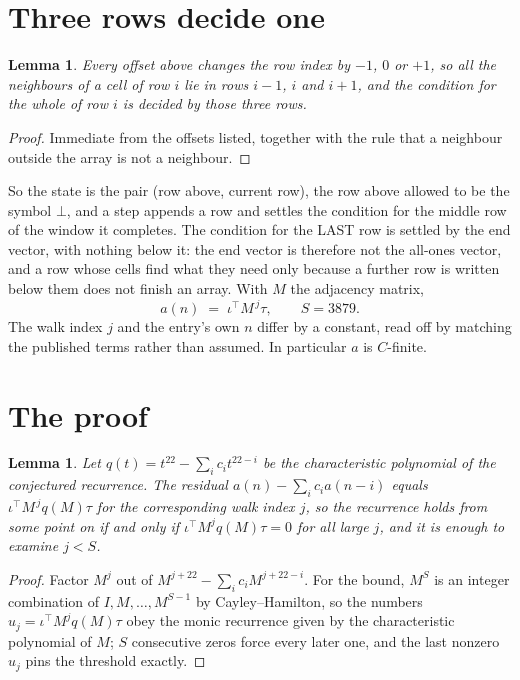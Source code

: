 \documentclass[11pt,a4paper]{article}
\theoremstyle{plain}
\newtheorem{lemma}[theorem]{Lemma}
\theoremstyle{definition}
\begin{document}
\section{Three rows decide one}

\begin{lemma}\label{lem:win}
Every offset above changes the row index by $-1$, $0$ or $+1$, so all the neighbours of a cell
of row $i$ lie in rows $i-1$, $i$ and $i+1$, and the condition for the whole of row $i$ is
decided by those three rows.
\end{lemma}

\begin{proof}
Immediate from the offsets listed, together with the rule that a neighbour outside the array is
not a neighbour.
\end{proof}

So the state is the pair (row above, current row), the row above allowed to be the symbol
$\bot$, and a step appends a row and settles the condition for the middle row of the window it
completes. The condition for the LAST row is settled by the end vector, with nothing below it:
the end vector is therefore not the all-ones vector, and a row whose cells find what they need
only because a further row is written below them does not finish an array. With $M$ the
adjacency matrix,
\[
a(n)\;=\;\iota^{\!\top}M^{\,j}\tau ,\qquad S=3879.
\]
The walk index $j$ and the entry's own $n$ differ by a constant, read off by matching the
published terms rather than assumed. In particular $a$ is $C$-finite.

\section{The proof}

\begin{lemma}\label{lem:crit}
Let $q(t)=t^{22}-\sum_i c_it^{22-i}$ be the characteristic polynomial of the
conjectured recurrence. The residual $a(n)-\sum_ic_ia(n-i)$ equals
$\iota^{\!\top}M^{\,j}q(M)\tau$ for the corresponding walk index $j$, so the recurrence
holds from some point on if and only if $\iota^{\!\top}M^{j}q(M)\tau=0$ for all large $j$,
and it is enough to examine $j<S$.
\end{lemma}

\begin{proof}
Factor $M^{j}$ out of $M^{j+22}-\sum_ic_iM^{j+22-i}$. For the bound, $M^{S}$
is an integer combination of $I,M,\dots,M^{S-1}$ by Cayley--Hamilton, so the numbers
$u_j=\iota^{\!\top}M^{j}q(M)\tau$ obey the monic recurrence given by the characteristic
polynomial of $M$; $S$ consecutive zeros force every later one, and the last nonzero $u_j$
pins the threshold exactly.
\end{proof}
\end{document}
